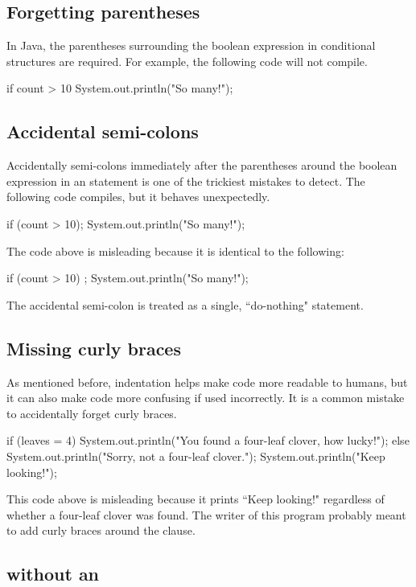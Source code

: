 \subsection{Forgetting parentheses}
In Java, the parentheses surrounding the boolean expression in conditional structures are required. For example, the following code will not compile.
\begin{code}
if count > 10
    System.out.println("So many!");
\end{code}

\subsection{Accidental semi-colons}
Accidentally semi-colons immediately after the parentheses around the boolean expression in an  statement is one of the trickiest mistakes to detect. The following code compiles, but it behaves unexpectedly. 
\begin{code}
if (count > 10);
    System.out.println("So many!");
\end{code}

\noindent The code above is misleading because it is identical to the following:
\begin{code}
if (count > 10) {
    ;
}
System.out.println("So many!");
\end{code}

\noindent The accidental semi-colon is treated as a single, ``do-nothing" statement.

\subsection{Missing curly braces}
As mentioned before, indentation helps make code more readable to humans, but it can also make code more confusing if used incorrectly. It is a common mistake to accidentally forget curly braces.

\begin{code}
if (leaves = 4) {
    System.out.println("You found a four-leaf clover, how lucky!");
} else
    System.out.println("Sorry, not a four-leaf clover.");
    System.out.println("Keep looking!");
\end{code}

\noindent This code above is misleading because it prints ``Keep looking!" regardless of whether a four-leaf clover was found. The writer of this program probably meant to add curly braces around the  clause.

\subsection{ without an }


